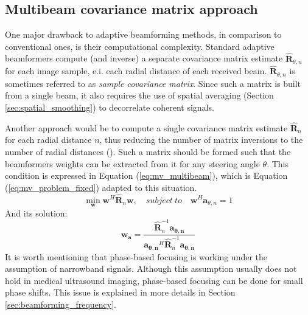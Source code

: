 \subsection{Multibeam covariance matrix approach}
\label{sec:multibeam}
One major drawback to adaptive beamforming methods, in comparison to conventional ones, is their computational complexity. Standard adaptive beamformers compute (and inverse) a separate covariance matrix estimate $\boldsymbol{\hat{R}}_{\theta, n}$ for each image sample, e.i. each radial distance of each received beam. $\boldsymbol{\hat{R}}_{\theta, n}$ is sometimes referred to as \textit{sample covariance matrix}. Since such a matrix is built from a single beam, it also requires the use of spatial averaging (Section \ref{sec:spatial_smoothing}) to decorrelate coherent signals.
\par
Another approach would be to compute a single covariance matrix estimate $\boldsymbol{\hat{R}}_n$ for each radial distance $n$, thus reducing the number of matrix inversions to the number of radial distances (\cite{Jensen_multibeam}). Such a matrix should be formed such that the beamformers weights can be extracted from it for any steering angle $\theta$. This condition is expressed in Equation (\ref{eq:mv_multibeam}), which is Equation (\ref{eq:mv_problem_fixed}) adapted to this situation.
\begin{equation}
    \min_{\boldsymbol{w}} \boldsymbol{w}^H \boldsymbol{\hat{R}}_n \boldsymbol{w}, \quad subject ~ to \quad \boldsymbol{w}^H \boldsymbol{a}_{\theta,n} = 1
\label{eq:mv_multibeam}
\end{equation}
\noindent
And its solution:
\begin{equation}
    \boldsymbol{w_a} = \frac{\boldsymbol{\hat{R}}_{n}^{-1} \boldsymbol{a_{\theta,n}}}{\boldsymbol{a_{\theta,n}}^H \boldsymbol{\hat{R}}_{n}^{-1} \boldsymbol{a_{\theta,n}}}
\label{eq:mvmb_weight}
\end{equation}
\noindent
It is worth mentioning that phase-based focusing is working under the assumption of narrowband signals. Although this assumption usually does not hold in medical ultrasound imaging, phase-based focusing can be done for small phase shifts. This issue is explained in more details in Section \ref{sec:beamforming_frequency}.

